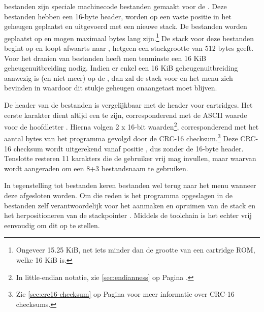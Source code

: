 \prg bestanden zijn speciale machinecode bestanden gemaakt voor de \product. Deze bestanden hebben een 16-byte header, worden op een vaste positie in het geheugen geplaatst en uitgevoerd met een nieuwe stack. De bestanden worden geplaatst op  en mogen maximaal  bytes lang zijn.\footnote{Ongeveer 15.25 KiB, net iets minder dan de grootte van een cartridge ROM, welke 16 KiB is.} De stack voor deze bestanden begint op  en loopt afwaarts naar , hetgeen een stackgrootte van 512 bytes geeft. Voor het draaien van \prg bestanden heeft men tenminste een 16 KiB geheugenuitbreiding nodig. Indien er enkel een 16 KiB geheugenuitbreiding aanwezig is (en niet meer) op de , dan zal de stack voor \basic en het menu zich bevinden in  waardoor dit stukje geheugen onaangetast moet blijven.

De header van de \prg bestanden is vergelijkbaar met de header voor  cartridges. Het eerste karakter dient altijd een  te zijn, corresponderend met de ASCII waarde voor de hoofdletter . Hierna volgen 2 x 16-bit waarden\footnote{In little-endian notatie, zie \cref{sec:endianness} op Pagina \pageref{sec:endianness}.}, corresponderend met het aantal bytes van het programma gevolgd door de CRC-16 checksum.\footnote{Zie \cref{sec:crc16-checksum} op Pagina \pageref{sec:crc16-checksum} voor meer informatie over CRC-16 checksums.} Deze CRC-16 checksum wordt uitgerekend vanaf positie , dus zonder de 16-byte header. Tenslotte resteren 11 karakters die de gebruiker vrij mag invullen, maar waarvan wordt aangeraden om een 8+3 bestandsnaam te gebruiken.


In tegenstelling tot \cas bestanden keren \prg bestanden wel terug naar het menu wanneer deze afgesloten worden. Om die reden is het programma opgeslagen in de \prg bestanden zelf verantwoordelijk voor het aanmaken en opruimen van de stack en het herpositioneren van de stackpointer . Middels de  toolchain is het echter vrij eenvoudig om dit op te stellen.